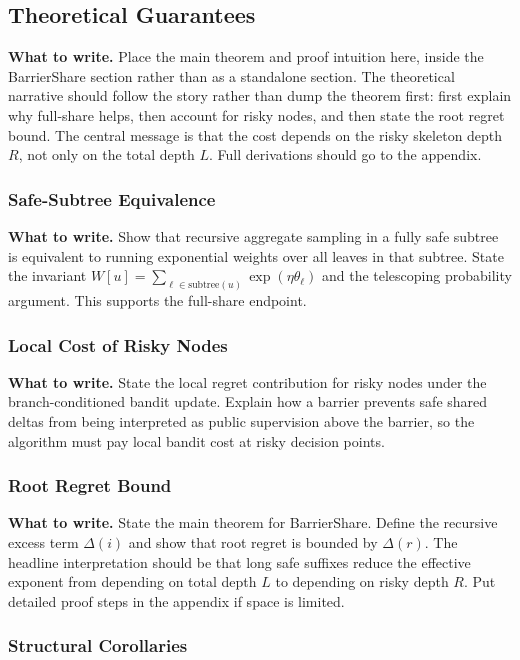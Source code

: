 \documentclass{article}
\newcommand{\towrite}[1]{\noindent\textbf{What to write.} #1}
\begin{document}
\subsection{Theoretical Guarantees}

\towrite{Place the main theorem and proof intuition here, inside the BarrierShare section rather than as a standalone section. The theoretical narrative should follow the story rather than dump the theorem first: first explain why full-share helps, then account for risky nodes, and then state the root regret bound. The central message is that the cost depends on the risky skeleton depth $R$, not only on the total depth $L$. Full derivations should go to the appendix.}

\subsubsection{Safe-Subtree Equivalence}

\towrite{Show that recursive aggregate sampling in a fully safe subtree is equivalent to running exponential weights over all leaves in that subtree. State the invariant $W[u]=\sum_{\ell \in \mathrm{subtree}(u)} \exp(\eta \theta_\ell)$ and the telescoping probability argument. This supports the full-share endpoint.}

\subsubsection{Local Cost of Risky Nodes}

\towrite{State the local regret contribution for risky nodes under the branch-conditioned bandit update. Explain how a barrier prevents safe shared deltas from being interpreted as public supervision above the barrier, so the algorithm must pay local bandit cost at risky decision points.}

\subsubsection{Root Regret Bound}

\towrite{State the main theorem for BarrierShare. Define the recursive excess term $\Delta(i)$ and show that root regret is bounded by $\Delta(r)$. The headline interpretation should be that long safe suffixes reduce the effective exponent from depending on total depth $L$ to depending on risky depth $R$. Put detailed proof steps in the appendix if space is limited.}

\subsubsection{Structural Corollaries}
\end{document}
